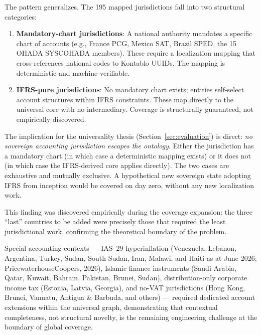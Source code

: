 The pattern generalizes. The 195 mapped jurisdictions fall into two structural categories:

\begin{enumerate}
  \item \textbf{Mandatory-chart jurisdictions}: A national authority mandates a specific chart of accounts (e.g., France PCG, Mexico SAT, Brazil SPED, the 15 OHADA SYSCOHADA members). These require a localization mapping that cross-references national codes to Kontablo UUIDs. The mapping is deterministic and machine-verifiable.
  \item \textbf{IFRS-pure jurisdictions}: No mandatory chart exists; entities self-select account structures within IFRS constraints. These map directly to the universal core with no intermediary. Coverage is structurally guaranteed, not empirically discovered.
\end{enumerate}

The implication for the universality thesis (Section~\ref{sec:evaluation}) is direct: \textit{no sovereign accounting jurisdiction escapes the ontology}. Either the jurisdiction has a mandatory chart (in which case a deterministic mapping exists) or it does not (in which case the IFRS-derived core applies directly). The two cases are exhaustive and mutually exclusive. A hypothetical new sovereign state adopting IFRS from inception would be covered on day zero, without any new localization work.

This finding was discovered empirically during the coverage expansion: the three ``last'' countries to be added were precisely those that required the least jurisdictional work, confirming the theoretical boundary of the problem.

Special accounting contexts --- IAS~29 hyperinflation (Venezuela, Lebanon, Argentina, Turkey, Sudan, South Sudan, Iran, Malawi, and Haiti as at June 2026; PricewaterhouseCoopers, 2026), Islamic finance instruments (Saudi Arabia, Qatar, Kuwait, Bahrain, Pakistan, Brunei, Sudan), distribution-only corporate income tax (Estonia, Latvia, Georgia), and no-VAT jurisdictions (Hong Kong, Brunei, Vanuatu, Antigua \& Barbuda, and others) --- required dedicated account extensions within the universal graph, demonstrating that contextual completeness, not structural novelty, is the remaining engineering challenge at the boundary of global coverage.
